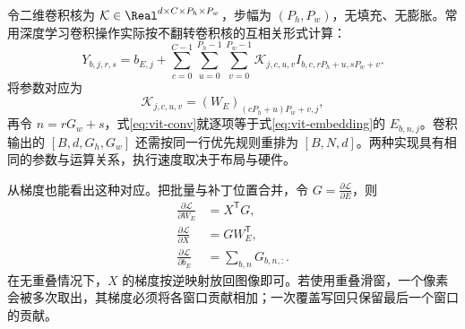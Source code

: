 \documentclass[../textbook.tex]{subfiles}
\begin{document}
令二维卷积核为 $\mathcal K\in\Real^{d\times C\times P_h\times P_w}$，步幅为 $(P_h,P_w)$，无填充、无膨胀。常用深度学习卷积操作实际按不翻转卷积核的互相关形式计算：
\begin{equation}
 Y_{b,j,r,s}=b_{E,j}+\sum_{c=0}^{C-1}\sum_{u=0}^{P_h-1}\sum_{v=0}^{P_w-1}
 \mathcal K_{j,c,u,v}I_{b,c,rP_h+u,sP_w+v}.
 \label{eq:vit-conv}
\end{equation}
将参数对应为
\begin{equation}
 \mathcal K_{j,c,u,v}=(W_E)_{(cP_h+u)P_w+v,j},
 \label{eq:vit-kernelmap}
\end{equation}
再令 $n=rG_w+s$，式\eqref{eq:vit-conv}就逐项等于式\eqref{eq:vit-embedding}的 $E_{b,n,j}$。卷积输出的 $[B,d,G_h,G_w]$ 还需按同一行优先规则重排为 $[B,N,d]$。两种实现具有相同的参数与运算关系，执行速度取决于布局与硬件。

从梯度也能看出这种对应。把批量与补丁位置合并，令 $G=\frac{\partial\mathcal L}{\partial E}$，则
\begin{equation}\label{eq:vit-patchgrad}
 \begin{aligned}
  \frac{\partial\mathcal L}{\partial W_E}&=X^{\mathsf T}G,\\
  \frac{\partial\mathcal L}{\partial X}&=GW_E^{\mathsf T},\\
  \frac{\partial\mathcal L}{\partial b_E}&=\sum_{b,n}G_{b,n,:}.
 \end{aligned}
\end{equation}
在无重叠情况下，$X$ 的梯度按逆映射放回图像即可。若使用重叠滑窗，一个像素会被多次取出，其梯度必须将各窗口贡献相加；一次覆盖写回只保留最后一个窗口的贡献。
\end{document}
